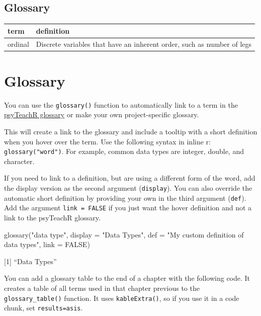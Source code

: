 \documentclass[
  oneside]{book}
\newenvironment{Shaded}{\begin{snugshade}}{\end{snugshade}}
\newcommand{\AttributeTok}[1]{\textcolor[rgb]{0.77,0.63,0.00}{#1}}
\newcommand{\ConstantTok}[1]{\textcolor[rgb]{0.00,0.00,0.00}{#1}}
\newcommand{\FunctionTok}[1]{\textcolor[rgb]{0.00,0.00,0.00}{#1}}
\newcommand{\NormalTok}[1]{#1}
\newcommand{\StringTok}[1]{\textcolor[rgb]{0.31,0.60,0.02}{#1}}
\begin{document}
\hypertarget{glossary}{%
\section{Glossary}\label{glossary}}

\begin{tabular}{l|l}
\hline
term & definition\\
\hline
ordinal & Discrete variables that have an inherent order, such as number of legs\\
\hline
\end{tabular}

\hypertarget{glossary-1}{%
\chapter{Glossary}\label{glossary-1}}

You can use the \texttt{glossary()} function to automatically link to a term in the \href{https://psyteachr.github.io/glossary/}{psyTeachR glossary} or make your own project-specific glossary.

This will create a link to the glossary and include a tooltip with a short definition when you hover over the term. Use the following syntax in inline r: \texttt{glossary("word")}. For example, common data types are integer, double, and character.

If you need to link to a definition, but are using a different form of the word, add the display version as the second argument (\texttt{display}). You can also override the automatic short definition by providing your own in the third argument (\texttt{def}). Add the argument \texttt{link\ =\ FALSE} if you just want the hover definition and not a link to the psyTeachR glossary.

\begin{Shaded}
\begin{Highlighting}[]
\FunctionTok{glossary}\NormalTok{(}\StringTok{"data type"}\NormalTok{, }
         \AttributeTok{display =} \StringTok{"Data Types"}\NormalTok{, }
         \AttributeTok{def =} \StringTok{"My custom definition of data types"}\NormalTok{, }
         \AttributeTok{link =} \ConstantTok{FALSE}\NormalTok{)}
\end{Highlighting}
\end{Shaded}

{[}1{]} ``Data Types''

You can add a glossary table to the end of a chapter with the following code. It creates a table of all terms used in that chapter previous to the \texttt{glossary\_table()} function. It uses \texttt{kableExtra()}, so if you use it in a code chunk, set \texttt{results=\textquotesingle{}asis\textquotesingle{}}.
\end{document}
